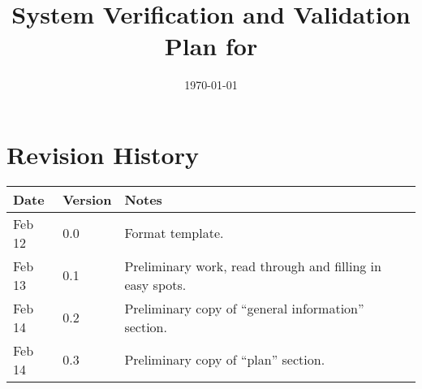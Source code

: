 \documentclass[12pt, titlepage]{article}
\begin{document}

\title{System Verification and Validation Plan for \progname{}}
\author{\authname}
\date{\today}

\maketitle



\section{Revision History}

\begin{tabularx}{\textwidth}{p{3cm}p{2cm}X} \toprule {
    \bf Date} & {\bf Version} & {\bf Notes}                                               \\
    \midrule
    Feb 12    & 0.0           & Format template.                                          \\
    Feb 13    & 0.1           & Preliminary work, read through and filling in easy spots. \\
    Feb 14    & 0.2           & Preliminary copy of ``general information'' section.      \\
    Feb 14    & 0.3           & Preliminary copy of ``plan'' section.                     \\
    \bottomrule
\end{tabularx}

\newpage

\tableofcontents

\newpage{}

\listoftables

\end{document}
